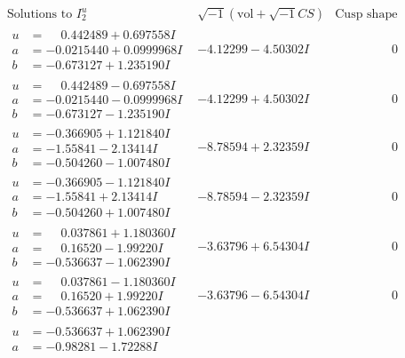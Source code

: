 \documentclass[1p]{elsarticle_modified}
\theoremstyle{definition}
\newcommand{\I}{\sqrt{-1}}
\begin{document}
$$\begin{array}{c|c|c}
\text{Solutions to }I^u_{2}& \I (\text{vol} + \sqrt{-1}CS) & \text{Cusp shape}\\
 \hline 
\begin{aligned}
u &= \phantom{-}0.442489 + 0.697558 I \\
a &= -0.0215440 + 0.0999968 I \\
b &= -0.673127 + 1.235190 I\end{aligned}
 & -4.12299 - 4.50302 I & \phantom{-0.000000 } 0 \\ \hline\begin{aligned}
u &= \phantom{-}0.442489 - 0.697558 I \\
a &= -0.0215440 - 0.0999968 I \\
b &= -0.673127 - 1.235190 I\end{aligned}
 & -4.12299 + 4.50302 I & \phantom{-0.000000 } 0 \\ \hline\begin{aligned}
u &= -0.366905 + 1.121840 I \\
a &= -1.55841 - 2.13414 I \\
b &= -0.504260 - 1.007480 I\end{aligned}
 & -8.78594 + 2.32359 I & \phantom{-0.000000 } 0 \\ \hline\begin{aligned}
u &= -0.366905 - 1.121840 I \\
a &= -1.55841 + 2.13414 I \\
b &= -0.504260 + 1.007480 I\end{aligned}
 & -8.78594 - 2.32359 I & \phantom{-0.000000 } 0 \\ \hline\begin{aligned}
u &= \phantom{-}0.037861 + 1.180360 I \\
a &= \phantom{-}0.16520 - 1.99220 I \\
b &= -0.536637 - 1.062390 I\end{aligned}
 & -3.63796 + 6.54304 I & \phantom{-0.000000 } 0 \\ \hline\begin{aligned}
u &= \phantom{-}0.037861 - 1.180360 I \\
a &= \phantom{-}0.16520 + 1.99220 I \\
b &= -0.536637 + 1.062390 I\end{aligned}
 & -3.63796 - 6.54304 I & \phantom{-0.000000 } 0 \\ \hline\begin{aligned}
u &= -0.536637 + 1.062390 I \\
a &= -0.98281 - 1.72288 I \\

\end{aligned}
\end{array}$$
\end{document}
